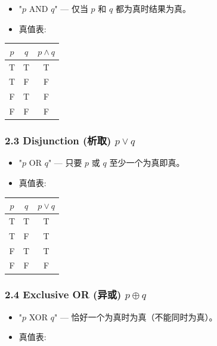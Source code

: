 \documentclass[10pt,a4paper,openany]{ctexbook}
\theoremstyle{definition}
\theoremstyle{remark}
\begin{document}
\begin{itemize}
\item "$p$ AND $q$" — 仅当 $p$ 和 $q$ 都为真时结果为真。
\item 真值表:

\end{itemize}

\begin{center}
\begin{tabular}{ccc}
\hline
$p$ & $q$ & $p \land q$ \\ \hline
T & T & T \\
T & F & F \\
F & T & F \\
F & F & F \\
\hline
\end{tabular}

\end{center}

\vspace{-2pt}

\subsubsection{2.3 Disjunction (析取) $p \lor q$}

\begin{itemize}
\item "$p$ OR $q$" — 只要 $p$ 或 $q$ 至少一个为真即真。
\item 真值表:

\end{itemize}

\begin{center}
\begin{tabular}{ccc}
\hline
$p$ & $q$ & $p \lor q$ \\ \hline
T & T & T \\
T & F & T \\
F & T & T \\
F & F & F \\
\hline
\end{tabular}

\end{center}

\vspace{-2pt}

\subsubsection{2.4 Exclusive OR (异或) $p \oplus q$}

\begin{itemize}
\item "$p$ XOR $q$" — 恰好一个为真时为真（不能同时为真）。
\item 真值表:

\end{itemize}
\end{document}
